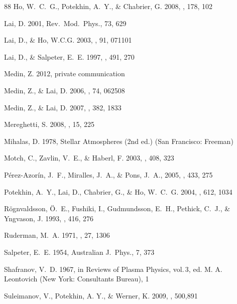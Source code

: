 \documentclass{aa}
\begin{document}
\begin{thebibliography}{88}
Ho, W.~C.~G., Potekhin, A.~Y., \& Chabrier, G.
2008,
\apjs, 178, 102

Lai, D.
2001,
Rev.\ Mod.\ Phys., 73, 629

Lai, D., \& Ho, W.C.G.
2003,
\prl, 91, 071101

Lai, D., \& Salpeter, E.~E.
1997,
\apj, 491, 270

Medin, Z.
2012,
private communication

Medin, Z., \& Lai, D.
2006,
\pra, 74, 062508

Medin, Z., \& Lai, D.
2007,
\mnras, 382, 1833

Mereghetti, S.
2008,
\aapr, 15, 225

Mihalas, D.
1978,
Stellar Atmospheres
(2nd ed.)
(San Francisco: Freeman)

Motch, C., Zavlin, V.~E., \& Haberl, F.
2003,
\aap, 408, 323

P\'erez-Azor\'in, J.~F.,  Miralles, J.~A., \& Pons, J.~A.,
2005, \aap, 433, 275

 Potekhin, A.~Y., Lai, D., Chabrier, G., \& Ho, W.~C.~G.
  2004, 
 \apj, {612}, 1034

R\"ognvaldsson, \"O.~E., Fushiki, I., Gudmundsson, E.~H.,
Pethick, C.~J., \& Yngvason, J.
1993,
\apj, 416, 276

Ruderman, M.~A.
1971,
\prl, 27, 1306

Salpeter, E.~E.
1954,
Australian J.~Phys., {7}, 373

Shafranov, V.~D. 1967,
in Reviews of Plasma Physics, vol.\,3,
ed. M. A. Leontovich
(New York: Consultants Bureau), 1

Suleimanov, V., Potekhin, A. Y., \& Werner, K.
2009,
\aap, 500,891


\end{thebibliography}
\end{document}
